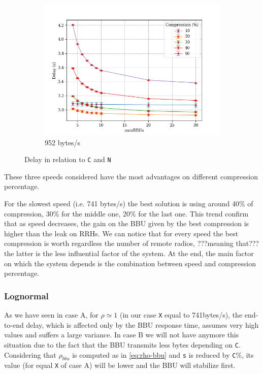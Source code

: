 \documentclass[11pt,a4paper,oneside, openright]{article}
\begin{document}
\begin{figure}[h]
\begin{subfigure}{.5\textwidth}
  \centering
  \includegraphics[width=\linewidth]{images/n-vs-delay-s-952}
  \caption{952 bytes/s}
  \label{fig:n-vs-delay-s-952}
\end{subfigure}
\caption{Delay in relation to \texttt{C} and \texttt{N}}
\label{fig:n-vs-delay}
\end{figure}

These three speeds considered have the most advantages on different compression percentage. 

For the slowest speed (i.e. 741 bytes/s) the best solution is using around 40\% of compression, 30\% for the middle one, 20\% for the last one.
This trend confirm that as speed decreases, the gain on the BBU given by the best compression is higher than the leak on RRHs.
We can notice that for every speed the best compression is worth regardless the number of remote radios, ???meaning that??? the latter is the less influential factor of the system.
At the end, the main factor on which the system depends is the combination between speed and compression percentage.

\subsubsection{Lognormal}
As we have seen in case A, for $\rho \simeq 1$ (in our case \texttt{X} equal to 741bytes/s), the end-to-end delay, which is affected only by the BBU response time, assumes very high values and suffers a large variance. In case B we will not have anymore this situation due to the fact that the BBU transmits less bytes depending on \texttt{C}. Considering that $\rho_{bbu}$ is computed as in \ref{eq:rho-bbu} and \texttt{s} is reduced by \texttt{C}\%, its value (for equal \texttt{X} of case A) will be lower and the BBU will stabilize first.
\end{document}

